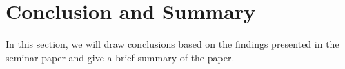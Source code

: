 \documentclass[a4paper,11pt,DIV=15]{scrartcl} %
\theoremstyle{plain}
\theoremstyle{definition}
\begin{document}
\section{Conclusion and Summary} %
In this section, we will draw conclusions based on the findings presented in the seminar paper and give a brief summary of the paper.












\clearpage



\end{document}
